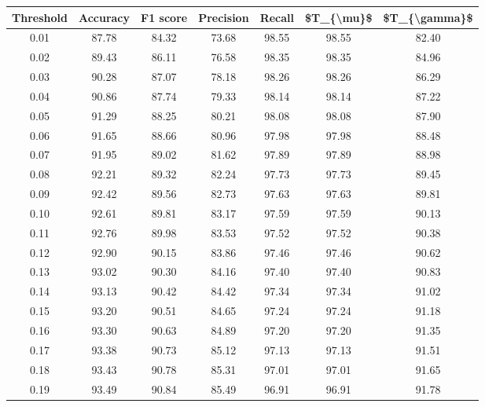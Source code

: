 \begin{tabular}{|c|c|c|c|c|c|c|}
\hline
 Threshold &  Accuracy &  F1 score &  Precision &  Recall &  \$T\_\{\textbackslash mu\}\$ &  \$T\_\{\textbackslash gamma\}\$ \\
\hline
      0.01 &     87.78 &     84.32 &      73.68 &   98.55 &      98.55 &         82.40 \\
      0.02 &     89.43 &     86.11 &      76.58 &   98.35 &      98.35 &         84.96 \\
      0.03 &     90.28 &     87.07 &      78.18 &   98.26 &      98.26 &         86.29 \\
      0.04 &     90.86 &     87.74 &      79.33 &   98.14 &      98.14 &         87.22 \\
      0.05 &     91.29 &     88.25 &      80.21 &   98.08 &      98.08 &         87.90 \\
      0.06 &     91.65 &     88.66 &      80.96 &   97.98 &      97.98 &         88.48 \\
      0.07 &     91.95 &     89.02 &      81.62 &   97.89 &      97.89 &         88.98 \\
      0.08 &     92.21 &     89.32 &      82.24 &   97.73 &      97.73 &         89.45 \\
      0.09 &     92.42 &     89.56 &      82.73 &   97.63 &      97.63 &         89.81 \\
      0.10 &     92.61 &     89.81 &      83.17 &   97.59 &      97.59 &         90.13 \\
      0.11 &     92.76 &     89.98 &      83.53 &   97.52 &      97.52 &         90.38 \\
      0.12 &     92.90 &     90.15 &      83.86 &   97.46 &      97.46 &         90.62 \\
      0.13 &     93.02 &     90.30 &      84.16 &   97.40 &      97.40 &         90.83 \\
      0.14 &     93.13 &     90.42 &      84.42 &   97.34 &      97.34 &         91.02 \\
      0.15 &     93.20 &     90.51 &      84.65 &   97.24 &      97.24 &         91.18 \\
      0.16 &     93.30 &     90.63 &      84.89 &   97.20 &      97.20 &         91.35 \\
      0.17 &     93.38 &     90.73 &      85.12 &   97.13 &      97.13 &         91.51 \\
      0.18 &     93.43 &     90.78 &      85.31 &   97.01 &      97.01 &         91.65 \\
      0.19 &     93.49 &     90.84 &      85.49 &   96.91 &      96.91 &         91.78 \\

\end{tabular}

